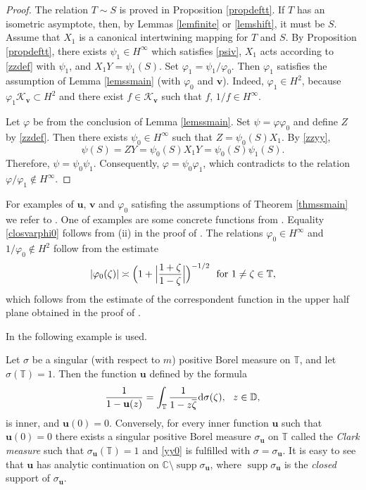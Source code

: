 \documentclass[a4paper,oneside,11pt]{amsart}
\numberwithin{equation}{section}
\theoremstyle{plain}
\theoremstyle{definition}
\begin{document}
\begin{proof} The relation $T\sim S$ is proved in Proposition  \ref{propdeftt}. If $T$ has an isometric asymptote, then, by  Lemmas \ref{lemfinite} or \ref{lemshift}, it must be $S$. 
 Assume that $X_1$ is a canonical intertwining mapping for $T$ and $S$. By Proposition  \ref{propdeftt}, there exists $\psi_1\in H^\infty$ 
which satisfies \eqref{psiv},  $X_1$ acts according to \eqref{zzdef} with $\psi_1$, and $X_1Y=\psi_1(S)$.  Set $\varphi_1=\psi_1/\varphi_0$. Then $\varphi_1$ satisfies the assumption of Lemma \ref{lemssmain}
(with $\varphi_0$ and $\mathbf v$). 
Indeed, $\varphi_1\in H^2$, because  $\varphi_1\mathcal K_{\mathbf v}\subset H^2$ and  there exist  
$f\in\mathcal K_{\mathbf v}$ such that $f$, $1/f\in H^\infty$. 


Let $\varphi$ be from the conclusion of Lemma \ref{lemssmain}. 
Set $\psi=\varphi\varphi_0$ and define $Z$ by \eqref{zzdef}. Then there exists $\psi_0\in H^\infty$ such that 
  $Z=\psi_0(S)X_1$. By \eqref{zzyy}, $$\psi(S)=ZY=\psi_0(S)X_1Y=\psi_0(S)\psi_1(S).$$
Therefore, $\psi=\psi_0\psi_1$. Consequently, $\varphi=\psi_0\varphi_1$, which  contradicts to the relation
 $\varphi/\varphi_1\not\in H^\infty$.
\end{proof}

For examples of ${\mathbf u}$, ${\mathbf v}$ and $\varphi_0$ satisfing the assumptions of Theorem \ref{thmssmain}
we refer to \cite{fhr}. One of examples are some concrete functions from {\cite[Theorem 6.14]{fhr}}. Equality  \eqref{closvarphi0} 
follows from (ii) in the proof of  {\cite[Theorem 6.14]{fhr}}. The relations $\varphi_0\in H^\infty$ and  
$1/\varphi_0\not\in H^2$ follow from the estimate 
$$|\varphi_0(\zeta)|\asymp \Bigl(1+\Bigl|\frac{1+\zeta}{1-\zeta}\Bigr|\Bigl)^{-1/2} \ \text{ for } 1\neq\zeta\in\mathbb T,$$
which follows from the estimate of the correspondent function in the upper half plane obtained in the proof of 
{\cite[Theorem 6.14]{fhr}}.

In the following example   {\cite[Section 7]{fhr}} is used. 

Let $\sigma$ be  a singular (with respect to $m$) positive Borel  measure on $\mathbb T$, and let $\sigma(\mathbb T)=1$. 
Then the function ${\mathbf u}$ defined by the formula
\begin{equation}
\label{yy0}
\frac{1}{1-{\mathbf u}(z)}=\int_{\mathbb T}\frac{1}{1-z\overline\zeta}\text{\rm d}\sigma(\zeta),  \ \ z\in\mathbb D,\end{equation}
is inner, and ${\mathbf u}(0)=0$. 
Conversely, for every inner function ${\mathbf u}$ such that ${\mathbf u}(0)=0$ there exists 
a singular positive Borel measure $\sigma_{\mathbf u}$ on $\mathbb T$ called the \emph{Clark measure} such that 
$\sigma_{\mathbf u}(\mathbb T)=1$ and \eqref{yy0} is fulfilled with $\sigma=\sigma_{\mathbf u}$.  
It is easy to see that ${\mathbf u}$ has analytic continuation on $\mathbb C\setminus\operatorname{supp}\sigma_{\mathbf u}$, 
where $\operatorname{supp}\sigma_{\mathbf u}$ is the \emph{closed} support of $\sigma_{\mathbf u}$. 
\end{document}
